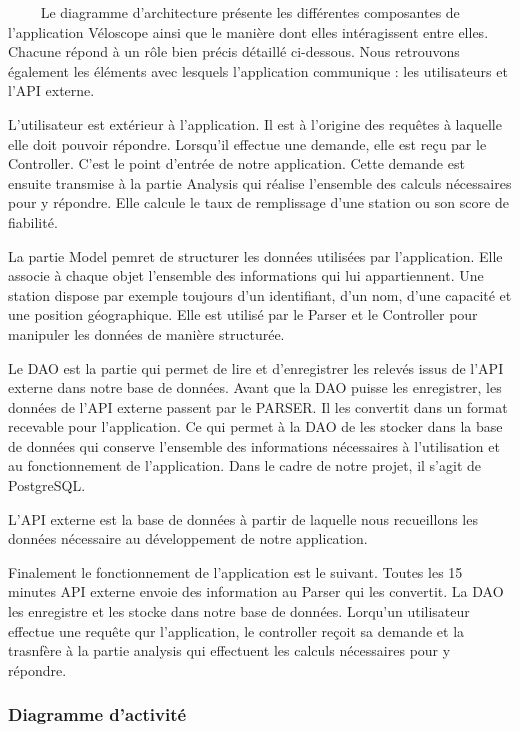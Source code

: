 \documentclass[
  french,
  11pt,
  a4paper,
]{article}
\begin{document}
~~~~ Le diagramme d'architecture présente les différentes composantes de
l'application Véloscope ainsi que le manière dont elles intéragissent
entre elles. Chacune répond à un rôle bien précis détaillé ci-dessous.
Nous retrouvons également les éléments avec lesquels l'application
communique : les utilisateurs et l'API externe.

L'utilisateur est extérieur à l'application. Il est à l'origine des
requêtes à laquelle elle doit pouvoir répondre. Lorsqu'il effectue une
demande, elle est reçu par le Controller. C'est le point d'entrée de
notre application. Cette demande est ensuite transmise à la partie
Analysis qui réalise l'ensemble des calculs nécessaires pour y répondre.
Elle calcule le taux de remplissage d'une station ou son score de
fiabilité.

La partie Model pemret de structurer les données utilisées par
l'application. Elle associe à chaque objet l'ensemble des informations
qui lui appartiennent. Une station dispose par exemple toujours d'un
identifiant, d'un nom, d'une capacité et une position géographique. Elle
est utilisé par le Parser et le Controller pour manipuler les données de
manière structurée.

Le DAO est la partie qui permet de lire et d'enregistrer les relevés
issus de l'API externe dans notre base de données. Avant que la DAO
puisse les enregistrer, les données de l'API externe passent par le
PARSER. Il les convertit dans un format recevable pour l'application. Ce
qui permet à la DAO de les stocker dans la base de données qui conserve
l'ensemble des informations nécessaires à l'utilisation et au
fonctionnement de l'application. Dans le cadre de notre projet, il
s'agit de PostgreSQL.

L'API externe est la base de données à partir de laquelle nous
recueillons les données nécessaire au développement de notre
application.

Finalement le fonctionnement de l'application est le suivant. Toutes les
15 minutes API externe envoie des information au Parser qui les
convertit. La DAO les enregistre et les stocke dans notre base de
données. Lorqu'un utilisateur effectue une requête qur l'application, le
controller reçoit sa demande et la trasnfère à la partie analysis qui
effectuent les calculs nécessaires pour y répondre.

\subsubsection{Diagramme d'activité}\label{diagramme-dactivituxe9}
\end{document}

